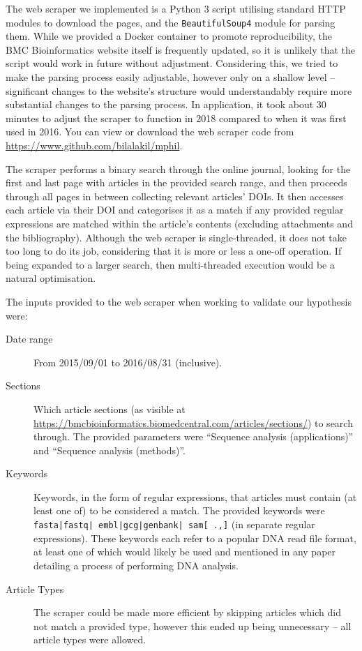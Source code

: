   The web scraper we implemented is a Python 3 script utilising standard HTTP modules to download the pages, and the \texttt{BeautifulSoup4} module for parsing them. While we provided a Docker container to promote reproducibility, the BMC Bioinformatics website itself is frequently updated, so it is unlikely that the script would work in future without adjustment. Considering this, we tried to make the parsing process easily adjustable, however only on a shallow level -- significant changes to the website's structure would understandably require more substantial changes to the parsing process. In application, it took about 30 minutes to adjust the scraper to function in 2018 compared to when it was first used in 2016. You can view or download the web scraper code from \url{https://www.github.com/bilalakil/mphil}.

  The scraper performs a binary search through the online journal, looking for the first and last page with articles in the provided search range, and then proceeds through all pages in between collecting relevant articles' DOIs. It then accesses each article via their DOI and categorises it as a match if any provided regular expressions are matched within the article's contents (excluding attachments and the bibliography). Although the web scraper is single-threaded, it does not take too long to do its job, considering that it is more or less a one-off operation. If being expanded to a larger search, then multi-threaded execution would be a natural optimisation.

  The inputs provided to the web scraper when working to validate our hypothesis were:

  \begin{description}
    \item[Date range] From 2015/09/01 to 2016/08/31 (inclusive).
    \item[Sections] Which article sections (as visible at \url{https://bmcbioinformatics.biomedcentral.com/articles/sections/}) to search through. The provided parameters were ``Sequence analysis (applications)'' and ``Sequence analysis (methods)''.
    \item[Keywords] Keywords, in the form of regular expressions, that articles must contain (at least one of) to be considered a match. The provided keywords were \texttt{fasta|fastq| embl|gcg|genbank| sam[ .,]} (in separate regular expressions). These keywords each refer to a popular DNA read file format, at least one of which would likely be used and mentioned in any paper detailing a process of performing DNA analysis.
    \item[Article Types] The scraper could be made more efficient by skipping articles which did not match a provided type, however this ended up being unnecessary -- all article types were allowed. 
  \end{description}

